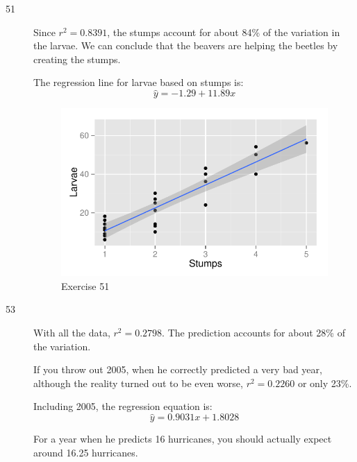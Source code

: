 \documentclass[letterpaper, landscape]{exam}
\begin{document}
\begin{description}
      \item[51]
        Since $r^2 = 0.8391$, the stumps account for about 84\% of the variation
        in the larvae.  We can conclude that the beavers are helping the beetles
        by creating the stumps.

        The regression line for larvae based on stumps is:
        \[
          \hat{y} = -1.29 + 11.89 x 
        \]

        \begin{figure}[H]
          \centering
          \includegraphics[scale = 0.9]{figures/ex51.pdf}
          \caption{Exercise 51}
        \end{figure}

      \pagebreak

      \item[53]
        With all the data, $r^2 = 0.2798$.  The prediction accounts for about
        28\% of the variation.  
        
        If you throw out 2005, when he correctly predicted a very bad year,
        although the reality turned out to be even worse, $r^2 = 0.2260$ or only
        23\%.

        Including 2005, the regression equation is:
        \[
          \hat{y} = 0.9031 x + 1.8028
        \]

        For a year when he predicts 16 hurricanes, you should actually expect
        around 16.25 hurricanes.


\end{description}
\end{document}
